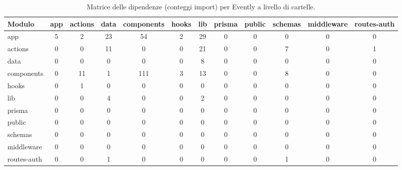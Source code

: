 \begin{table}[h]
\centering
\small
\begin{tabular}{|l|c|c|c|c|c|c|c|c|c|c|c|}
\hline
\textbf{Modulo} & \textbf{app} & \textbf{actions} & \textbf{data} & \textbf{components} & \textbf{hooks} & \textbf{lib} & \textbf{prisma} & \textbf{public} & \textbf{schemas} & \textbf{middleware} & \textbf{routes-auth} \\ \hline
app & 5 & 2 & 23 & 54 & 2 & 29 & 0 & 0 & 0 & 0 & 0 \\ \hline
actions & 0 & 0 & 11 & 0 & 0 & 21 & 0 & 0 & 7 & 0 & 1 \\ \hline
data & 0 & 0 & 0 & 0 & 0 & 8 & 0 & 0 & 0 & 0 & 0 \\ \hline
components & 0 & 11 & 1 & 111 & 3 & 13 & 0 & 0 & 8 & 0 & 0 \\ \hline
hooks & 0 & 1 & 0 & 0 & 0 & 0 & 0 & 0 & 0 & 0 & 0 \\ \hline
lib & 0 & 0 & 4 & 0 & 0 & 2 & 0 & 0 & 0 & 0 & 0 \\ \hline
prisma & 0 & 0 & 0 & 0 & 0 & 0 & 0 & 0 & 0 & 0 & 0 \\ \hline
public & 0 & 0 & 0 & 0 & 0 & 0 & 0 & 0 & 0 & 0 & 0 \\ \hline
schemas & 0 & 0 & 0 & 0 & 0 & 0 & 0 & 0 & 0 & 0 & 0 \\ \hline
middleware & 0 & 0 & 0 & 0 & 0 & 0 & 0 & 0 & 0 & 0 & 0 \\ \hline
routes-auth & 0 & 0 & 1 & 0 & 0 & 0 & 0 & 0 & 1 & 0 & 0 \\ \hline
\end{tabular}
\caption{Matrice delle dipendenze (conteggi import) per Evently a livello di cartelle.}
\end{table}
